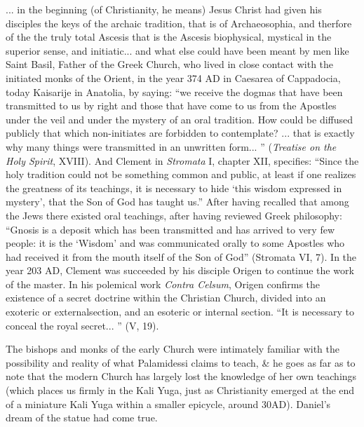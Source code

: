 \begin{quotex}
... in the beginning (of Christianity, he means) Jesus Christ had given his disciples the keys of the archaic tradition, that is of Archaeosophia, and therfore of the the truly total Ascesis that is the Ascesis biophysical, mystical in the superior sense, and initiatic... and what else could have been meant by men like Saint Basil, Father of the Greek Church, who lived in close contact with the initiated monks of the Orient, in the year 374 AD in Caesarea of Cappadocia, today Kaisarije in Anatolia, by saying: ``we receive the dogmas that have been transmitted to us by right and those that have come to us from the Apostles under the veil and under the mystery of an oral tradition. How could be diffused publicly that which non-initiates are forbidden to contemplate? ... that is exactly why many things were transmitted in an unwritten form... '' (\emph{Treatise on the Holy Spirit}, XVIII). And Clement in \emph{Stromata} I, chapter XII, specifies: ``Since the holy tradition could not be something common and public, at least if one realizes the greatness of its teachings, it is necessary to hide `this wisdom expressed in mystery', that the Son of God has taught us.'' After having recalled that among the Jews there existed oral teachings, after having reviewed Greek philosophy: ``Gnosis is a deposit which has been transmitted and has arrived to very few people: it is the `Wisdom' and was communicated orally to some Apostles who had received it from the mouth itself of the Son of God'' (Stromata VI, 7). In the year 203 AD, Clement was succeeded by his disciple Origen to continue the work of the master. In his polemical work \emph{Contra Celsum}, Origen confirms the existence of a secret doctrine within the Christian Church, divided into an exoteric or externalsection, and an esoteric or internal section. ``It is necessary to conceal the royal secret... '' (V, 19).

\end{quotex}

The bishops and monks of the early Church were intimately familiar with the possibility and reality of what Palamidessi claims to teach, \& he goes as far as to note that the modern Church has largely lost the knowledge of her own teachings (which places us firmly in the Kali Yuga, just as Christianity emerged at the end of a miniature Kali Yuga within a smaller epicycle, around 30AD). Daniel's dream of the statue had come true.


